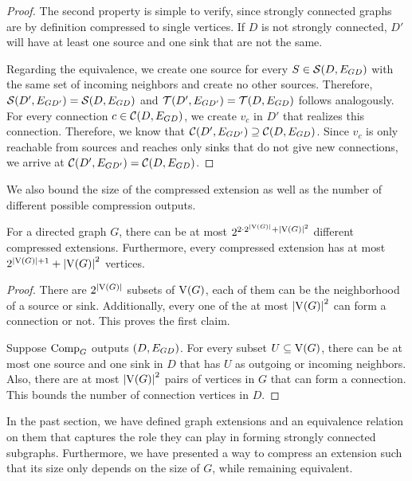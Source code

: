 \begin{theorem}
\begin{lemma}
\begin{theorem}
\begin{proof}
  The second property is simple to verify, since strongly connected graphs are by definition compressed to single vertices. If $D$ is not strongly connected, $D'$ will have at least one source and one sink that are not the same.
  
  Regarding the equivalence, we create one source for every $S \in \operatorname{\mathcal{S}}({D,E_{{G}{D}}})$ with the same set of incoming neighbors and create no other sources. Therefore, $\operatorname{\mathcal{S}}({D', E_{GD'}}) = \operatorname{\mathcal{S}}({D,E_{{G}{D}}})$ and $\operatorname{\mathcal{T}}({D',E_{GD'}}) = \operatorname{\mathcal{T}}({D,E_{{G}{D}}})$ follows analogously.
  For every connection $c \in \operatorname{\mathcal{C}}({D,E_{{G}{D}}})$, we create $v_c$ in $D'$ that realizes this connection. Therefore, we know that $\operatorname{\mathcal{C}}({D',E_{GD'}}) \supseteq \operatorname{\mathcal{C}}({D,E_{{G}{D}}})$. Since $v_c$ is only reachable from sources and reaches only sinks that do not give new connections, we arrive at $\operatorname{\mathcal{C}}({D',E_{GD'}}) = \operatorname{\mathcal{C}}({D,E_{{G}{D}}})$. 
\end{proof}

We also bound the size of the compressed extension as well as the number of different possible compression outputs.

\iflong
\begin{lemma}
\else
\begin{lemma}[$\star$]
\fi
\label{lem:range_size_comp}
  For a directed graph $G$, there can be at most $2^{2\cdot 2^{\abs{\ve{G}}} + \abs{\ve{G}}^2}$ different compressed extensions.
  Furthermore, every compressed extension has at most $2^{\abs{\ve{G}}+1} + \abs{\ve{G}}^2$ vertices.
\end{lemma}
\iflong
\begin{proof}
  There are $2^{\abs{\ve{G}}}$ subsets of $\operatorname{V}({G})$, each of them can be the neighborhood of a source or sink. Additionally, every one of the at most $\abs{\ve{G}}^2$ can form a connection or not. This proves the first claim. 

  Suppose $\operatorname{\textrm{Comp}}_G$ outputs $({D}, E_{{G}{D}})$. For every subset $U \subseteq \operatorname{V}({G})$, there can be at most one source and one sink in $D$ that has $U$ as outgoing or incoming neighbors. Also, there are at most $\abs{\ve{G}}^2$ pairs of vertices in $G$ that can form a connection. This bounds the number of connection vertices in $D$.
\end{proof}
\fi

In the past section, we have defined graph extensions and an equivalence relation on them that captures the role they can play in forming strongly connected subgraphs. Furthermore, we have presented a way to compress an extension such that its size only depends on the size of $G$, while remaining equivalent.


\end{lemma}
\end{theorem}
\end{lemma}
\end{theorem}
